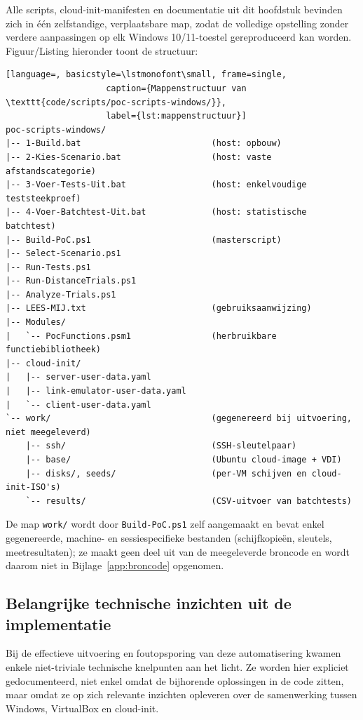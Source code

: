 Alle scripts, cloud-init-manifesten en documentatie uit dit hoofdstuk bevinden zich in
één zelfstandige, verplaatsbare map, zodat de volledige opstelling zonder verdere
aanpassingen op elk Windows 10/11-toestel gereproduceerd kan worden. Figuur/Listing
hieronder toont de structuur:

\begin{lstlisting}[language=, basicstyle=\lstmonofont\small, frame=single,
                    caption={Mappenstructuur van \texttt{code/scripts/poc-scripts-windows/}},
                    label={lst:mappenstructuur}]
poc-scripts-windows/
|-- 1-Build.bat                          (host: opbouw)
|-- 2-Kies-Scenario.bat                  (host: vaste afstandscategorie)
|-- 3-Voer-Tests-Uit.bat                 (host: enkelvoudige teststeekproef)
|-- 4-Voer-Batchtest-Uit.bat             (host: statistische batchtest)
|-- Build-PoC.ps1                        (masterscript)
|-- Select-Scenario.ps1
|-- Run-Tests.ps1
|-- Run-DistanceTrials.ps1
|-- Analyze-Trials.ps1
|-- LEES-MIJ.txt                         (gebruiksaanwijzing)
|-- Modules/
|   `-- PocFunctions.psm1                (herbruikbare functiebibliotheek)
|-- cloud-init/
|   |-- server-user-data.yaml
|   |-- link-emulator-user-data.yaml
|   `-- client-user-data.yaml
`-- work/                                (gegenereerd bij uitvoering, niet meegeleverd)
    |-- ssh/                             (SSH-sleutelpaar)
    |-- base/                            (Ubuntu cloud-image + VDI)
    |-- disks/, seeds/                   (per-VM schijven en cloud-init-ISO's)
    `-- results/                         (CSV-uitvoer van batchtests)
\end{lstlisting}

De map \texttt{work/} wordt door \texttt{Build-PoC.ps1} zelf aangemaakt en bevat enkel
gegenereerde, machine- en sessiespecifieke bestanden (schijfkopieën, sleutels,
meetresultaten); ze maakt geen deel uit van de meegeleverde broncode en wordt daarom niet
in Bijlage~\ref{app:broncode} opgenomen.

\subsection{Belangrijke technische inzichten uit de implementatie}%
\label{subsec:technische-inzichten}

Bij de effectieve uitvoering en foutopsporing van deze automatisering kwamen enkele
niet-triviale technische knelpunten aan het licht. Ze worden hier expliciet gedocumenteerd,
niet enkel omdat de bijhorende oplossingen in de code zitten, maar omdat ze op zich
relevante inzichten opleveren over de samenwerking tussen Windows, VirtualBox en
cloud-init.

